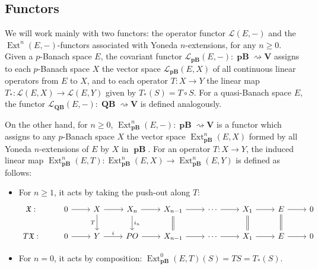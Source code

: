 \documentclass[12pt,a4paper]{amsproc}
\theoremstyle{remark}
\theoremstyle{definition}
\newcommand{\QBan}{\operatorname{\textbf{QB}}}
\newcommand{\pBan}{\operatorname{\textbf{pB}}}
\numberwithin{equation}{section}
\begin{document}
\subsection{Functors} \label{sec:pre_2.5}
We will work mainly with two functors: the operator functor $\mathcal{L}(E,-)$ and the $\operatorname{Ext}^n(E,-)$-functors associated with Yoneda $n$-extensions, for any $n \ge 0$. Given a $p$-Banach space $E$, the covariant functor $\mathcal{L}_{\boldsymbol{\pBan}}(E,-): \boldsymbol{\pBan} \rightsquigarrow \mathbf{V}$ assigns to each $p$-Banach space $X$ the vector space $\mathcal{L}_{\boldsymbol{\pBan}}(E,X)$ of all continuous linear operators from $E$ to $X$, and to each operator $T: X \to Y$ the linear map $T_*: \mathcal{L}(E,X) \to \mathcal{L}(E,Y)$ given by $T_*(S) = T \circ S$. For a quasi-Banach space $E$, the functor $\mathcal{L}_{\boldsymbol{\QBan}}(E,-): \boldsymbol{\QBan} \rightsquigarrow \mathbf{V}$ is defined analogously.

\par On the other hand, for $n \ge 0$, $\operatorname{Ext}^n_{\boldsymbol{\pBan}}(E,-): \boldsymbol{\pBan} \rightsquigarrow \mathbf{V}$ is a functor which assigns to any $p$-Banach space $X$ the vector space $\operatorname{Ext}^n_{\boldsymbol{\pBan}}(E,X)$ formed by all Yoneda $n$-extensions of $E$ by $X$ in $\boldsymbol{\pBan}$. For an operator $T: X \to Y$, the induced linear map $\operatorname{Ext}^n_{\boldsymbol{\pBan}}(E,T): \operatorname{Ext}^n_{\boldsymbol{\pBan}}(E,X) \to \operatorname{Ext}^n_{\boldsymbol{\pBan}}(E,Y)$ is defined as follows:
\begin{itemize}
    \item For $n \ge 1$, it acts by taking the push-out along $T$:
    \begin{equation}
	\notag
	\begin{tikzcd}
		\mathfrak{X}: & 0 \arrow[r] & X \arrow[r] \arrow[d, "T"'] & X_n \arrow[r] \arrow[d, "i_n"] & X_{n-1} \arrow[r] \arrow[d, equal] & \cdots \arrow[r] & X_1 \arrow[r] \arrow[d, equal] & E \arrow[r] \arrow[d, equal] & 0 \\
		T\mathfrak{X}: & 0 \arrow[r] & Y \arrow[r, "i"] & PO \arrow[r] & X_{n-1} \arrow[r] & \cdots \arrow[r] & X_1 \arrow[r] & E \arrow[r] & 0
	\end{tikzcd}
\end{equation}
    \item For $n = 0$, it acts by composition: $\operatorname{Ext}^0_{\boldsymbol{\pBan}}(E,T)(S) = TS = T_*(S)$.
\end{itemize}
\end{document}
